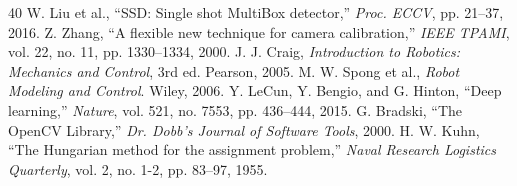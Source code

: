 \documentclass[conference]{IEEEtran}
\begin{document}
\begin{thebibliography}{40}
 W. Liu et al., ``SSD: Single shot MultiBox detector,'' \textit{Proc. ECCV}, pp. 21--37, 2016.
 Z. Zhang, ``A flexible new technique for camera calibration,'' \textit{IEEE TPAMI}, vol. 22, no. 11, pp. 1330--1334, 2000.
 J. J. Craig, \textit{Introduction to Robotics: Mechanics and Control}, 3rd ed. Pearson, 2005.
 M. W. Spong et al., \textit{Robot Modeling and Control}. Wiley, 2006.
 Y. LeCun, Y. Bengio, and G. Hinton, ``Deep learning,'' \textit{Nature}, vol. 521, no. 7553, pp. 436--444, 2015.
 G. Bradski, ``The OpenCV Library,'' \textit{Dr. Dobb's Journal of Software Tools}, 2000.
 H. W. Kuhn, ``The Hungarian method for the assignment problem,'' \textit{Naval Research Logistics Quarterly}, vol. 2, no. 1-2, pp. 83--97, 1955.
\end{thebibliography}
\end{document}
